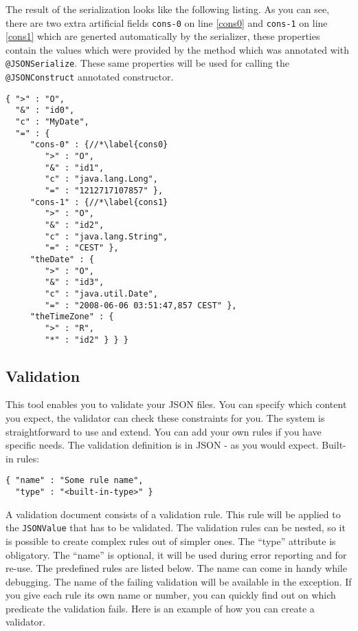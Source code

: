 \documentclass[a4paper]{article}
\begin{document}
The result of the serialization looks like the following listing. As you can see, there are two extra artificial fields \lstinline{cons-0} on line \ref{cons0} and \lstinline{cons-1} on line \ref{cons1} which are generted automatically by the serializer, these properties contain the values which were provided by the method which was annotated with \lstinline{@JSONSerialize}. These same properties will be used for calling the \lstinline{@JSONConstruct} annotated constructor.

\begin{lstlisting}
{ ">" : "O",
  "&" : "id0",
  "c" : "MyDate",
  "=" : {
     "cons-0" : {//*\label{cons0}     
        ">" : "O",
        "&" : "id1",
        "c" : "java.lang.Long",
        "=" : "1212717107857" },
     "cons-1" : {//*\label{cons1}            
        ">" : "O",
        "&" : "id2",
        "c" : "java.lang.String",
        "=" : "CEST" },
     "theDate" : {
        ">" : "O",
        "&" : "id3",
        "c" : "java.util.Date",
        "=" : "2008-06-06 03:51:47,857 CEST" },
     "theTimeZone" : {
        ">" : "R",
        "*" : "id2" } } }
\end{lstlisting}

 
\subsection{Validation}

This tool enables you to validate your JSON files. You can specify which content you expect, the validator can check these constraints for you. The system is straightforward to use and extend. You can add your own rules if you have specific needs. The validation definition is in JSON - as you would expect. Built-in rules:

\medskip
\begin{lstlisting}
{ "name" : "Some rule name",
  "type" : "<built-in-type>" }
\end{lstlisting}
\medskip

A validation document consists of a validation rule. This rule will be applied to the \lstinline{JSONValue} that has to be validated. The validation rules can be nested, so it is possible to create complex rules out of simpler ones. The ``type'' attribute is obligatory.  The  ``name'' is optional, it will be used during error reporting and for re-use.  The predefined rules are listed below. The name can come in handy while debugging. The name of the failing validation will be available in the exception. If you give each rule its own name or number, you can quickly find out on which predicate the validation fails. Here is an example of how you can create a validator.
\end{document}
